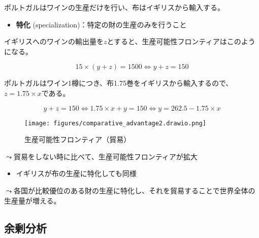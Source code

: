 \documentclass[
  xelatex,
  ja=standard]{bxjsarticle}
\providecommand{\tightlist}{%
  \setlength{\itemsep}{0pt}\setlength{\parskip}{0pt}}\usepackage{longtable,booktabs,array}
\begin{document}
\begin{tcolorbox}[enhanced jigsaw, coltitle=black, breakable, opacitybacktitle=0.6, left=2mm, titlerule=0mm, arc=.35mm, colbacktitle=quarto-callout-tip-color!10!white, opacityback=0, leftrule=.75mm, title=\textcolor{quarto-callout-tip-color}{\faLightbulb}\hspace{0.5em}{イギリスとポルトガルの貿易'\,'\,'}, toptitle=1mm, bottomrule=.15mm, colframe=quarto-callout-tip-color-frame, toprule=.15mm, colback=white, rightrule=.15mm, bottomtitle=1mm]

ポルトガルはワインの生産だけを行い、布はイギリスから輸入する。

\end{tcolorbox}

\begin{itemize}
\tightlist
\item
  \textbf{特化} (specialization)：特定の財の生産のみを行うこと
\end{itemize}

イギリスへのワインの輸出量を\(z\)とすると、生産可能性フロンティアはこのようになる。

\[
15 \times (y + z) = 1500
\Leftrightarrow y + z = 150
\]

ポルトガルはワイン1樽につき、布1.75巻をイギリスから輸入するので、\(z = 1.75 \times x\)である。

\[
y + z = 150
\Leftrightarrow 1.75 \times x + y = 150
\Leftrightarrow y = 262.5 - 1.75 \times x
\]

\begin{figure}[htpb]

{\centering \texttt{[image: figures/comparative\_advantage2.drawio.png]}

}

\caption{生産可能性フロンティア（貿易）}

\end{figure}

\(\leadsto\)貿易をしない時に比べて、生産可能性フロンティアが拡大

\begin{itemize}
\tightlist
\item
  イギリスが布の生産に特化しても同様
\end{itemize}

\(\leadsto\)各国が比較優位のある財の生産に特化し、それを貿易することで世界全体の生産量が増える。

\hypertarget{ux4f59ux5270ux5206ux6790}{%
\subsection{余剰分析}\label{ux4f59ux5270ux5206ux6790}}
\end{document}
